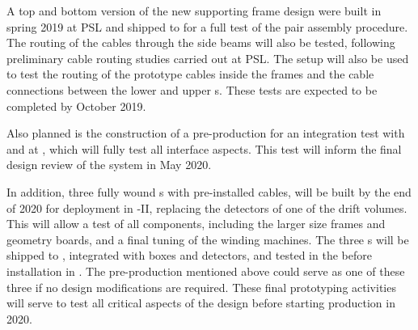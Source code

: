 A top and bottom version of the new supporting  frame design were built in spring 2019 at PSL and shipped to  for a full test of the  pair %
assembly procedure.  The routing of the  cables through the  side beams will also be tested, following preliminary cable routing studies carried out at PSL. The  setup will also be used to test the routing of the  prototype cables inside the  frames and the cable connections between the lower and upper s.  These tests are expected to be completed by October 2019.

Also planned is the construction of a pre-production  for an integration test with  and  at , which will fully test all interface aspects. This test will inform the final design review of the  system in May 2020. 

In addition, three fully wound s with pre-installed  cables, will be built by the end of 2020 for deployment in -II, replacing the detectors of one of the drift volumes.  This will allow a test of all  components, including the larger size frames and geometry boards, and a final tuning of the winding machines. The three s will be shipped to , integrated with  boxes and  detectors, and tested in the \coldbox before installation in .  The pre-production  mentioned above could serve as one of these three if no design modifications are required.  These final prototyping activities will serve to test all critical aspects of the  design before starting   production in 2020.  

